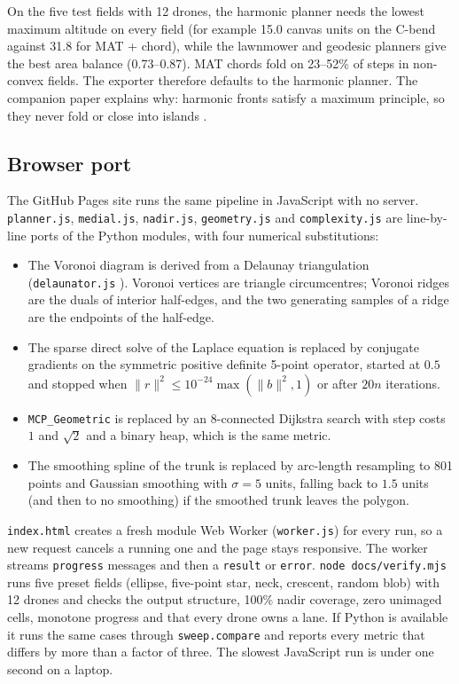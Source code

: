 \documentclass[11pt,a4paper]{article}
\newcommand{\code}[1]{\texttt{#1}}
\begin{document}
On the five test fields with 12 drones, the harmonic planner needs the lowest maximum altitude on every
field (for example 15.0 canvas units on the C-bend against 31.8 for MAT + chord), while the lawnmower and
geodesic planners give the best area balance (0.73--0.87). MAT chords fold on 23--52\% of steps in
non-convex fields. The exporter therefore defaults to the harmonic planner. The companion paper explains
why: harmonic fronts satisfy a maximum principle, so they never fold or close into islands \cite{coverage}.

\subsection{Browser port}
\label{sec:browser}

The GitHub Pages site runs the same pipeline in JavaScript with no server. \code{planner.js},
\code{medial.js}, \code{nadir.js}, \code{geometry.js} and \code{complexity.js} are line-by-line ports of the
Python modules, with four numerical substitutions:

\begin{itemize}
  \item The Voronoi diagram is derived from a Delaunay triangulation (\code{delaunator.js} \cite{delaunator}).
        Voronoi vertices are triangle circumcentres; Voronoi ridges are the duals of interior half-edges, and
        the two generating samples of a ridge are the endpoints of the half-edge.
  \item The sparse direct solve of the Laplace equation is replaced by conjugate gradients on the symmetric
        positive definite 5-point operator, started at $0.5$ and stopped when
        $\lVert r\rVert^2\le 10^{-24}\max(\lVert b\rVert^2,1)$ or after $20n$ iterations.
  \item \code{MCP\_Geometric} is replaced by an 8-connected Dijkstra search with step costs $1$ and $\sqrt2$
        and a binary heap, which is the same metric.
  \item The smoothing spline of the trunk is replaced by arc-length resampling to 801 points and Gaussian
        smoothing with $\sigma = 5$ units, falling back to $1.5$ units (and then to no smoothing) if the
        smoothed trunk leaves the polygon.
\end{itemize}

\code{index.html} creates a fresh module Web Worker (\code{worker.js}) for every run, so a new request
cancels a running one and the page stays responsive. The worker streams \code{progress} messages and then a
\code{result} or \code{error}. \code{node docs/verify.mjs} runs five preset fields (ellipse, five-point star,
neck, crescent, random blob) with 12 drones and checks the output structure, 100\% nadir coverage, zero
unimaged cells, monotone progress and that every drone owns a lane. If Python is available it runs the same
cases through \code{sweep.compare} and reports every metric that differs by more than a factor of three. The
slowest JavaScript run is under one second on a laptop.
\end{document}
